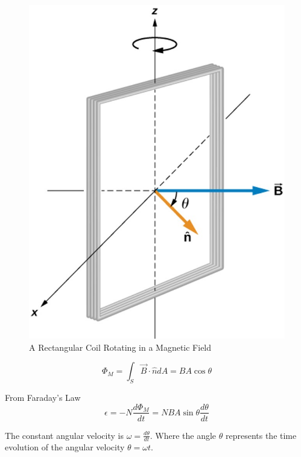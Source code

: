 \documentclass[14pt]{memoir}
\begin{document}
\begin{figure}[H]
\begin{center}
\includegraphics[scale=0.5]{fig/fig_13_17.jpg}
\caption{A Rectangular Coil Rotating in a Magnetic Field}
\label{fig:13_17}
\end{center}
\end{figure}

\begin{equation}
\Phi_M = \int_S \vec{B} \cdot \hat{n} dA = B A \cos{\theta}
\end{equation}

From Faraday's Law
\begin{equation}
\epsilon = -N \frac{d \Phi_M}{dt} = N B A \sin{\theta} \frac{d\theta}{dt}
\end{equation}

The constant angular velocity is  $\omega = \frac{d\theta}{dt}$. Where the angle $\theta$ represents the time evolution of the angular velocity $\theta = \omega t$. 
\end{document}
